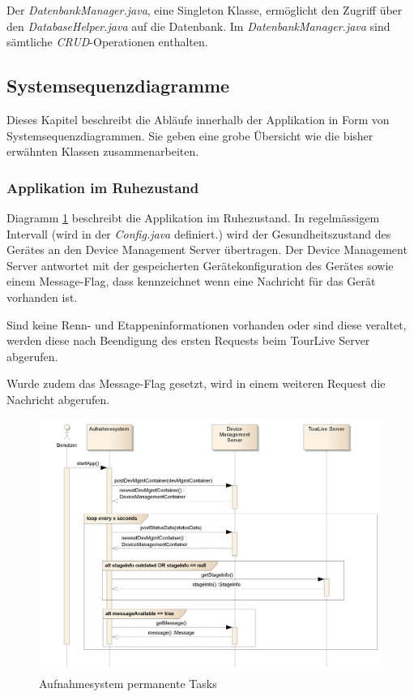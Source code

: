 Der \textit{DatenbankManager.java}, eine Singleton Klasse, ermöglicht den Zugriff über den \textit{DatabaseHelper.java} auf die Datenbank. Im \textit{DatenbankManager.java} sind sämtliche \textit{\gls{CRUD}}-Operationen enthalten.

\subsection{Systemsequenzdiagramme}
Dieses Kapitel beschreibt die Abläufe innerhalb der Applikation in Form von Systemsequenzdiagrammen. Sie geben eine grobe Übersicht wie die bisher erwähnten Klassen zusammenarbeiten.

\subsubsection{Applikation im Ruhezustand}
Diagramm \ref{fig:permanenttasks} beschreibt die Applikation im Ruhezustand. In regelmässigem Intervall (wird in der \textit{Config.java} definiert.) wird der Gesundheitszustand des Gerätes an den Device Management Server übertragen. Der Device Management Server antwortet mit der gespeicherten Gerätekonfiguration des Gerätes sowie einem Message-Flag, dass kennzeichnet wenn eine Nachricht für das Gerät vorhanden ist. 

Sind keine Renn- und Etappeninformationen vorhanden oder sind diese veraltet, werden diese nach Beendigung des ersten Requests beim TourLive Server abgerufen.

Wurde zudem das Message-Flag gesetzt, wird in einem weiteren Request die Nachricht abgerufen. 

 
\begin{figure}[H]
	\centering
	\includegraphics[width=130mm]{images/android/permanent_taskes.jpg}
	\caption{Aufnahmesystem permanente Tasks}
	\label{fig:permanenttasks}
\end{figure}

